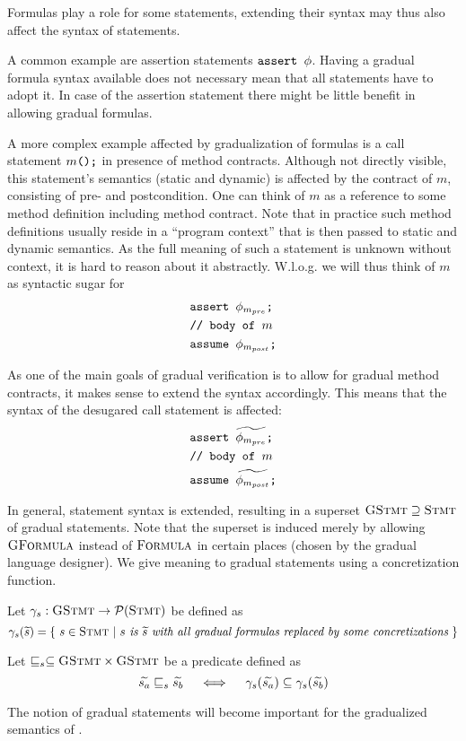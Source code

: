 Formulas play a role for some statements, extending their syntax may thus also affect the syntax of statements.


A common example are assertion statements $\textup{\texttt{assert $\phi$}}$.
Having a gradual formula syntax available does not necessary mean that all statements have to adopt it.
In case of the assertion statement there might be little benefit in allowing gradual formulas.

A more complex example affected by gradualization of formulas is a call statement $\textup{\texttt{$m$();}}$ in presence of method contracts.
Although not directly visible, this statement's semantics (static and dynamic) is affected by the contract of $m$, consisting of pre- and postcondition.
One can think of $m$ as a reference to some method definition including method contract.
Note that in practice such method definitions usually reside in a “program context” that is then passed to static and dynamic semantics.
As the full meaning of such a statement is unknown without context, it is hard to reason about it abstractly.
W.l.o.g. we will thus think of $m$ as syntactic sugar for 
\begin{align*}
&\textup{\texttt{assert $\phi_{m_{pre}}$;}}\\
&\textup{\texttt{// body of $m$}}\\
&\textup{\texttt{assume $\phi_{m_{post}}$;}}
\end{align*}

As one of the main goals of gradual verification is to allow for gradual method contracts, it makes sense to extend the syntax accordingly.
This means that the syntax of the desugared call statement is affected:
\begin{align*}
&\textup{\texttt{assert $\widetilde{\phi_{m_{pre}}}$;}}\\
&\textup{\texttt{// body of $m$}}\\
&\textup{\texttt{assume $\widetilde{\phi_{m_{post}}}$;}}
\end{align*}

In general, statement syntax is extended, resulting in a superset $\textup{\textsc{GStmt}} \supseteq \textup{\textsc{Stmt}}$ of gradual statements.
Note that the superset is induced merely by allowing $\textup{\textsc{GFormula}}$ instead of $\textup{\textsc{Formula}}$ in certain places (chosen by the gradual language designer).
We give meaning to gradual statements using a concretization function. %
\begin{definition}
    Let $\gamma_s : \textup{\textsc{GStmt}} \rightarrow \mathcal{P}(\textup{\textsc{Stmt}})$ be defined as
    \begin{displaymath}
    \gamma_s(\widetilde{s}) = \{~ s \in \textup{\textsc{Stmt}} ~|~ \textit{$s$ is $\widetilde{s}$ with all gradual formulas replaced by some concretizations} ~\}
    \end{displaymath}
\end{definition}
\begin{definition}
    Let $\sqsubseteq_s \subseteq \textup{\textsc{GStmt}} \times \textup{\textsc{GStmt}}$ be a predicate defined as
    $$\widetilde{s_a} \sqsubseteq_s \widetilde{s_b}  \quad\iff\quad  \gamma_s(\widetilde{s_a}) \subseteq \gamma_s(\widetilde{s_b})$$
\end{definition}

The notion of gradual statements will become important for the gradualized semantics of \gvl.
